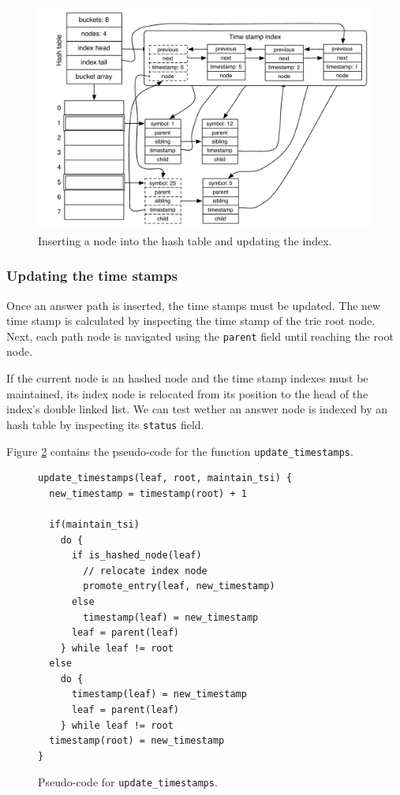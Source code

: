\begin{figure}[ht]
  \centering
    \includegraphics[scale=0.6]{hash_table_insert.pdf}
  \caption{Inserting a node into the hash table and updating the index.}
  \label{fig:hash_table_insert}
\end{figure}

\subsubsection{Updating the time stamps}

Once an answer path is inserted, the time stamps must be updated.
The new time stamp is calculated by inspecting the time stamp of the trie root node.
Next, each path node is navigated using the \texttt{parent} field until reaching the root node.

If the current node is an hashed node and the time stamp indexes
must be maintained, its index node is relocated from its position to the head of the index's double linked list. We can test wether an answer node is indexed by an hash table by inspecting
its \texttt{status} field.

Figure \ref{fig:update_timestamps} contains the pseudo-code for the function \texttt{update\_timestamps}.

\begin{figure}[ht]
\begin{Verbatim}[fontsize=\small]
update_timestamps(leaf, root, maintain_tsi) {
  new_timestamp = timestamp(root) + 1
  
  if(maintain_tsi)
    do {
      if is_hashed_node(leaf)
        // relocate index node
        promote_entry(leaf, new_timestamp)
      else
        timestamp(leaf) = new_timestamp
      leaf = parent(leaf)
    } while leaf != root
  else
    do {
      timestamp(leaf) = new_timestamp
      leaf = parent(leaf)
    } while leaf != root
  timestamp(root) = new_timestamp
}
\end{Verbatim}
\caption{Pseudo-code for \texttt{update\_timestamps}.}
\label{fig:update_timestamps}
\end{figure}

